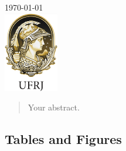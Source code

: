 \documentclass[12pt]{article}
\begin{document}
\begin{titlepage}
{\large \today}\\[2cm] %


\includegraphics[height=3.5cm]{logos/ufrj-logo.png}\\[1cm]


\vfill %

\end{titlepage}


\begin{abstract}
Your abstract.
\end{abstract}









\subsection{Tables and Figures}


\end{document}
